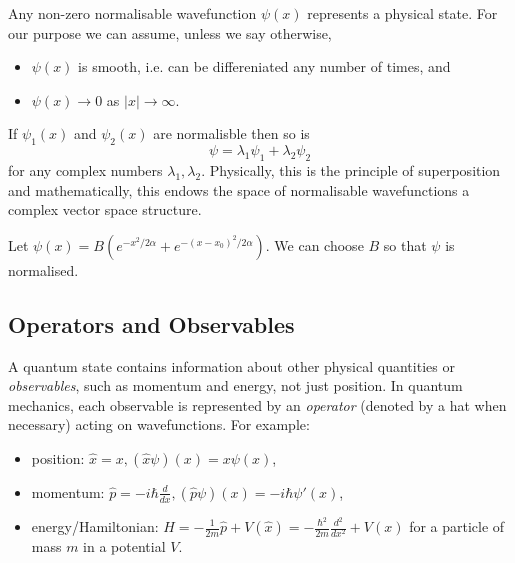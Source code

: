 \documentclass[a4paper]{article}
\theoremstyle{definition}
\begin{document}
Any non-zero normalisable wavefunction $\psi(x)$ represents a physical state. For our purpose we can assume, unless we say otherwise,
\begin{assumption}\leavevmode
\begin{itemize}
\item $\psi(x)$ is smooth, i.e. can be differeniated any number of times, and
  \item $\psi(x) \to 0$ as $|x|\to\infty$.
\end{itemize}
\end{assumption}

If $\psi_1(x)$ and $\psi_2(x)$ are normalisble then so is
\[
  \psi = \lambda_1\psi_1 + \lambda_2\psi_2
\]
for any complex numbers $\lambda_1, \lambda_2$. Physically, this is the principle of superposition and mathematically, this endows the space of normalisable wavefunctions a complex vector space structure.

\begin{eg}
  Let $\psi(x) = B(e^{-x^2/2\alpha}+e^{-(x-x_0)^2/2\alpha})$. We can choose $B$ so that $\psi$ is normalised.
  \begin{center}
  \end{center}
 
\end{eg}

\subsection{Operators and Observables}

A quantum state contains information about other physical quantities or \emph{observables}, such as momentum and energy, not just position. In quantum mechanics, each observable is represented by an \emph{operator} (denoted by a hat when necessary) acting on wavefunctions. For example:
\begin{itemize}
  \item position: $\hat x = x, (\hat{x}\psi)(x) = x\psi(x)$,
  \item momentum: $\hat{p} = -i\hbar \frac{d}{dx}, (\hat{p}\psi)(x) = -i\hbar\psi'(x)$,
  \item energy/Hamiltonian: $H = -\frac{1}{2m}\hat{p} + V(\hat{x}) = -\frac{\hbar^2}{2m}\frac{d^2}{dx^2} + V(x)$ for a particle of mass $m$ in a potential $V$.
  \end{itemize}
\end{document}
